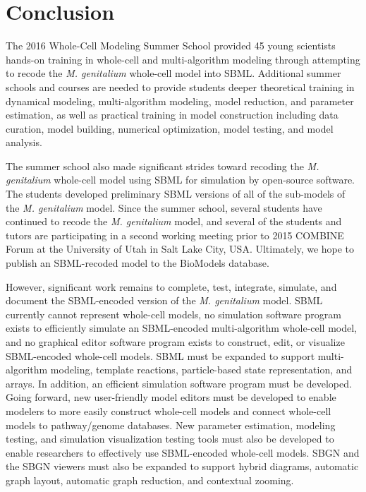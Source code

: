 \documentclass[journal,transmag]{IEEEtran}
\begin{document}
\section{Conclusion}
The 2016 Whole-Cell Modeling Summer School provided 45 young scientists hands-on training in whole-cell and multi-algorithm modeling through attempting to recode the \textit{M. genitalium} whole-cell model into SBML. Additional summer schools and courses are needed to provide students deeper theoretical training in dynamical modeling, multi-algorithm modeling, model reduction, and parameter estimation, as well as practical training in model construction including data curation, model building, numerical optimization, model testing, and model analysis.

The summer school also made significant strides toward recoding the \textit{M. genitalium} whole-cell model using SBML for simulation by open-source software. The students developed preliminary SBML versions of all of the sub-models of the \textit{M. genitalium} model. Since the summer school, several students have continued to recode the \textit{M. genitalium} model, and several of the students and tutors are participating in a second working meeting prior to 2015 COMBINE Forum at the University of Utah in Salt Lake City, USA. Ultimately, we hope to publish an SBML-recoded model to the BioModels database. 

However, significant work remains to complete, test, integrate, simulate, and document the SBML-encoded version of the \textit{M. genitalium} model. SBML currently cannot represent whole-cell models, no simulation software program exists to efficiently simulate an SBML-encoded multi-algorithm whole-cell model, and no graphical editor software program exists to construct, edit, or visualize SBML-encoded whole-cell models. SBML must be expanded to support multi-algorithm modeling, template reactions, particle-based state representation, and arrays. In addition, an efficient simulation software program must be developed. Going forward, new user-friendly model editors must be developed to enable modelers to more easily construct whole-cell models and connect whole-cell models to pathway/genome databases. New parameter estimation, modeling testing, and simulation visualization testing tools must also be developed to enable researchers to effectively use SBML-encoded whole-cell models. SBGN and the SBGN viewers must also be expanded to support hybrid diagrams, automatic graph layout, automatic graph reduction, and contextual zooming.
\end{document}
